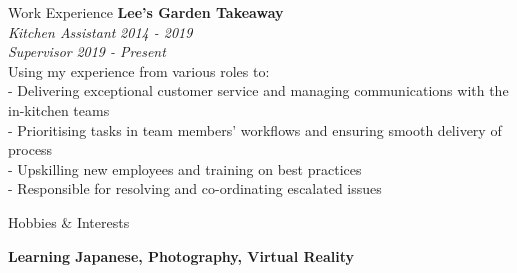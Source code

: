 \documentclass{resume} %
\begin{document}
\begin{rSection}{Work Experience}
{\bf Lee's Garden Takeaway } 
\\{\textit{Kitchen Assistant}} \hfill {\em 2014 - 2019} 
\\{\textit{Supervisor}} \hfill {\em 2019 - Present} 
\\Using my experience from various roles to: 
\\- Delivering exceptional customer service and managing communications with the in-kitchen teams
\\- Prioritising tasks in team members' workflows and ensuring smooth delivery of process
\\- Upskilling new employees and training on best practices 
\\- Responsible for resolving and co-ordinating escalated issues 

\end{rSection}

\begin{rSection}{Hobbies \& Interests}

{\bf Learning Japanese, Photography, Virtual Reality }

\end{rSection}



\end{document}
